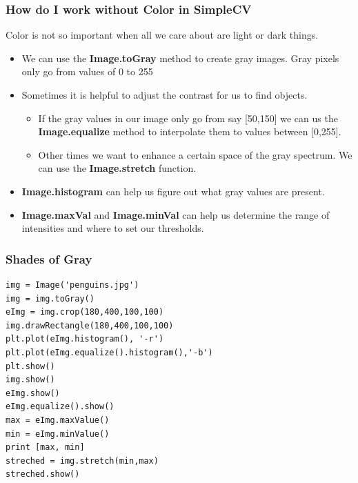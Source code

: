 \documentclass{beamer}
\begin{document}
\begin{frame}
\frametitle{How do I work \textbf{without}  Color in SimpleCV}
Color is not so important when all we care about are light or dark
things. 
\begin{itemize}
\item We can use the \textbf{Image.toGray} method to create gray
  images. Gray pixels only go from values of 0 to 255
\item Sometimes it is helpful to adjust the contrast for us to find objects.
  \begin{itemize}
    \item If the gray values in our image only go from say [50,150] we
      can us the \textbf{Image.equalize} method to interpolate them to
      values between [0,255].
    \item Other times we want to enhance a certain space of the gray
      spectrum. We can use the \textbf{Image.stretch} function. 
    \end{itemize}
\item \textbf{Image.histogram} can help us figure out what gray values
  are present.
\item \textbf{Image.maxVal} and \textbf{Image.minVal} can help us
  determine the range of intensities and where to set our thresholds.
\end{itemize}
\end{frame}
\begin{frame}[fragile] 
\frametitle{Shades of Gray}
\begin{example}
\begin{verbatim}
img = Image('penguins.jpg')
img = img.toGray()
eImg = img.crop(180,400,100,100)
img.drawRectangle(180,400,100,100)
plt.plot(eImg.histogram(), '-r')
plt.plot(eImg.equalize().histogram(),'-b')
plt.show()
img.show()
eImg.show()
eImg.equalize().show()
max = eImg.maxValue()
min = eImg.minValue()
print [max, min]
streched = img.stretch(min,max)
streched.show()
\end{verbatim}
\end{example}
\end{frame}
\end{document}
